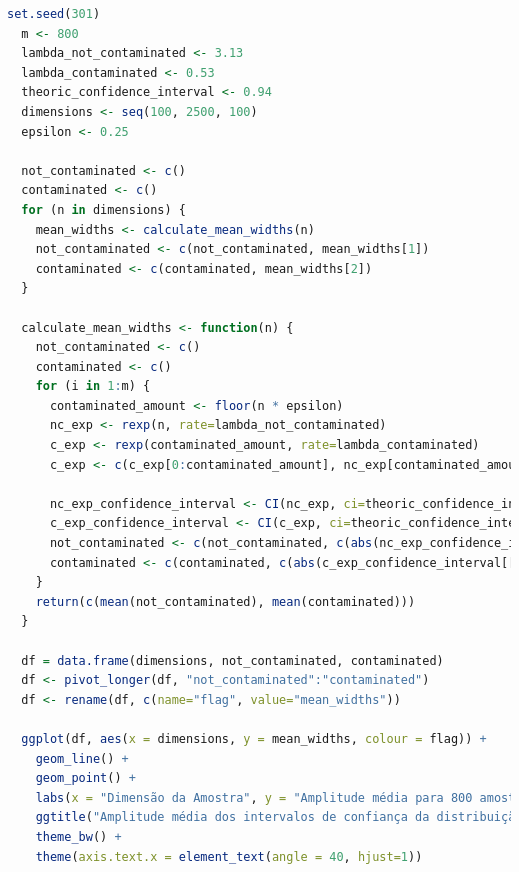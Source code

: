 \documentclass[11pt]{article}
\begin{document}
\begin{lstlisting}[language=R]
  set.seed(301)
  m <- 800
  lambda_not_contaminated <- 3.13
  lambda_contaminated <- 0.53
  theoric_confidence_interval <- 0.94
  dimensions <- seq(100, 2500, 100)
  epsilon <- 0.25

  not_contaminated <- c()
  contaminated <- c()
  for (n in dimensions) {
    mean_widths <- calculate_mean_widths(n)
    not_contaminated <- c(not_contaminated, mean_widths[1])
    contaminated <- c(contaminated, mean_widths[2])
  }

  calculate_mean_widths <- function(n) {
    not_contaminated <- c()
    contaminated <- c()
    for (i in 1:m) {
      contaminated_amount <- floor(n * epsilon)
      nc_exp <- rexp(n, rate=lambda_not_contaminated)
      c_exp <- rexp(contaminated_amount, rate=lambda_contaminated)
      c_exp <- c(c_exp[0:contaminated_amount], nc_exp[contaminated_amount:n])

      nc_exp_confidence_interval <- CI(nc_exp, ci=theoric_confidence_interval)
      c_exp_confidence_interval <- CI(c_exp, ci=theoric_confidence_interval)
      not_contaminated <- c(not_contaminated, c(abs(nc_exp_confidence_interval[["upper"]] - nc_exp_confidence_interval[["lower"]])))
      contaminated <- c(contaminated, c(abs(c_exp_confidence_interval[["upper"]] - c_exp_confidence_interval[["lower"]])))
    }
    return(c(mean(not_contaminated), mean(contaminated)))
  }

  df = data.frame(dimensions, not_contaminated, contaminated)
  df <- pivot_longer(df, "not_contaminated":"contaminated")
  df <- rename(df, c(name="flag", value="mean_widths"))

  ggplot(df, aes(x = dimensions, y = mean_widths, colour = flag)) +
    geom_line() +
    geom_point() +
    labs(x = "Dimensão da Amostra", y = "Amplitude média para 800 amostras") +
    ggtitle("Amplitude média dos intervalos de confiança da distribuição exponencial") +
    theme_bw() +
    theme(axis.text.x = element_text(angle = 40, hjust=1))
\end{lstlisting}
\end{document}

